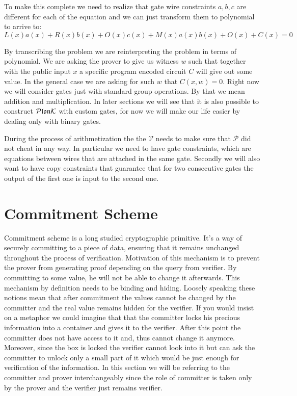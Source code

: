 To make this complete we need to realize that gate wire constraints $a, b, c$ are different for each of the equation and we can just transform them to polynomial to arrive to:
$$L(x)a(x) + R(x)b(x) + O(x)c(x) + M(x)a(x)b(x) + O(x) + C(x) = 0$$


By transcribing the problem we are reinterpreting the problem in terms of polynomial. We are asking the prover to give us witness $w$ such that together with the public input $x$ a specific program encoded circuit $C$ will give out some value. In the general case we are asking for such $w$ that $C(x,w) = 0$. Right now we will consider gates just with standard group operations. By that we mean addition and multiplication. In later sections we will see that it is also possible to construct $\mathcal{P}\mathfrak{lon}\mathcal{K}$ with custom gates, for now we will make our life easier by dealing only with binary gates.

During the process of arithmetization the the $\mathcal{V}$ needs to make sure that $\mathcal{P}$ did not cheat in any way. In particular we need to have gate constraints, which are equations between wires that are attached in the same gate. Secondly we will also want to have copy constraints that guarantee that for two consecutive gates the output of the first one is input to the second one. 

\section{Commitment Scheme}
Commitment scheme is a long studied cryptographic primitive. It's a way of securely committing to a piece of data, ensuring that it remains unchanged throughout the process of verification. Motivation of this mechanism is to prevent the prover from generating proof depending on the query from verifier. By committing to some value, he will not be able to change it afterwards. This mechanism by definition needs to be binding and hiding. Loosely speaking these notions mean that after commitment the values cannot be changed by the committer and the real value remains hidden for the verifier. If you would insist on a metaphor we could imagine that that the committer locks his precious information into a container and gives it to the verifier. After this point the committer does not have access to it and, thus cannot change it anymore. Moreover, since the box is locked the verifier cannot look into it but can ask the committer to unlock only a small part of it which would be just enough for verification of the information. In this section we will be referring to the committer and prover interchangeably since the role of committer is taken only by the prover and the verifier just remains verifier.

